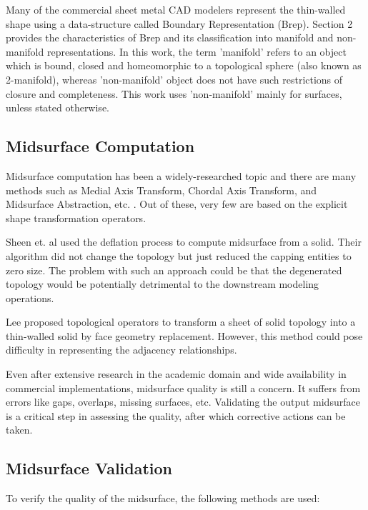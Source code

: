 Many of the commercial sheet metal CAD modelers represent the thin-walled shape using a data-structure called Boundary Representation (Brep). Section 2 provides the characteristics of Brep and its classification into manifold and non-manifold representations. In this work, the term 'manifold' refers to an object which is bound, closed and homeomorphic to a topological sphere (also known as 2-manifold), whereas 'non-manifold' object does not have such restrictions of closure and completeness. This work uses 'non-manifold' mainly for surfaces, unless stated otherwise.


\subsection{Midsurface Computation}

Midsurface computation has been a widely-researched topic and there are many methods such as Medial Axis Transform, Chordal Axis Transform, and Midsurface Abstraction, etc.  \cite{Thakur2009}. Out of these, very few are based on the explicit shape transformation operators. 

Sheen et. al \cite{Sheen2008} used the deflation process to compute midsurface from a solid. Their algorithm did not change the topology but just reduced the capping entities to zero size. The problem with such an approach could be that the degenerated topology would be potentially detrimental to the downstream modeling operations.

Lee \cite{Lee2009a} proposed topological operators to transform a sheet of solid topology into a thin-walled solid by face geometry replacement. However, this method could pose difficulty in representing the adjacency relationships.

Even after extensive research in the academic domain and wide availability in commercial implementations, midsurface quality is still a concern. It suffers from errors like gaps, overlaps, missing surfaces, etc. Validating the output midsurface is a critical step in assessing the quality, after which corrective actions can be taken.

\subsection{Midsurface Validation}

To verify the quality of the midsurface, the following methods are used:

